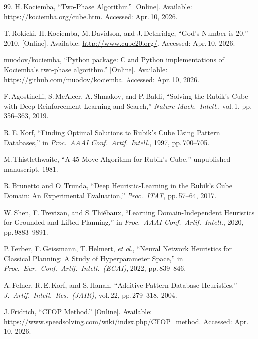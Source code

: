 \documentclass[graybox]{svmult}
\begin{document}
\begin{thebibliography}{99.}
H.\,Kociemba, ``Two-Phase Algorithm.'' [Online]. Available:
\url{https://kociemba.org/cube.htm}. Accessed: Apr.\,10, 2026.

T.\,Rokicki, H.\,Kociemba, M.\,Davidson, and J.\,Dethridge,
``God's Number is 20,'' 2010. [Online]. Available:
\url{http://www.cube20.org/}. Accessed: Apr.\,10, 2026.

muodov/kociemba, ``Python package: C and Python implementations of
Kociemba's two-phase algorithm.'' [Online]. Available:
\url{https://github.com/muodov/kociemba}. Accessed: Apr.\,10, 2026.

F.\,Agostinelli, S.\,McAleer, A.\,Shmakov, and P.\,Baldi,
``Solving the {R}ubik's {C}ube with Deep Reinforcement Learning and
Search,'' \textit{Nature Mach.\ Intell.}, vol.\,1, pp.\,356--363, 2019.

R.\,E.\,Korf, ``Finding Optimal Solutions to {R}ubik's {C}ube Using
Pattern Databases,'' in \textit{Proc.\ AAAI Conf.\ Artif.\ Intell.},
1997, pp.\,700--705.

M.\,Thistlethwaite, ``A 45-Move Algorithm for {R}ubik's {C}ube,''
unpublished manuscript, 1981.

R.\,Brunetto and O.\,Trunda, ``Deep Heuristic-Learning in the
{R}ubik's {C}ube Domain: An Experimental Evaluation,''
\textit{Proc.\ ITAT}, pp.\,57--64, 2017.

W.\,Shen, F.\,Trevizan, and S.\,Thi\'ebaux, ``Learning
Domain-Independent Heuristics for Grounded and Lifted Planning,''
in \textit{Proc.\ AAAI Conf.\ Artif.\ Intell.}, 2020,
pp.\,9883--9891.

P.\,Ferber, F.\,Geissmann, T.\,Helmert, \textit{et al.},
``Neural Network Heuristics for Classical Planning: A Study of
Hyperparameter Space,'' in \textit{Proc.\ Eur.\ Conf.\ Artif.\
Intell.\ (ECAI)}, 2022, pp.\,839--846.

A.\,Felner, R.\,E.\,Korf, and S.\,Hanan,
``Additive Pattern Database Heuristics,'' \textit{J.\ Artif.\
Intell.\ Res.\ (JAIR)}, vol.\,22, pp.\,279--318, 2004.

J.\,Fridrich, ``CFOP Method.'' [Online]. Available:
\url{https://www.speedsolving.com/wiki/index.php/CFOP_method}. Accessed: Apr.\,10, 2026.


\end{thebibliography}
\end{document}
